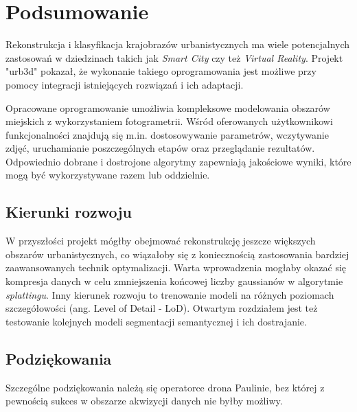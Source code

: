 \section{Podsumowanie}
Rekonstrukcja i klasyfikacja krajobrazów urbanistycznych ma wiele potencjalnych zastosowań w dziedzinach takich jak \textit{Smart City} czy też \textit{Virtual Reality}. Projekt "urb3d" pokazał, że wykonanie takiego oprogramowania jest możliwe przy pomocy integracji istniejących rozwiązań i ich adaptacji.

Opracowane oprogramowanie umożliwia kompleksowe modelowania obszarów miejskich z wykorzystaniem fotogrametrii. Wśród oferowanych użytkownikowi funkcjonalności znajdują się m.in. dostosowywanie parametrów, wczytywanie zdjęć, uruchamianie poszczególnych etapów oraz przeglądanie rezultatów. Odpowiednio dobrane i dostrojone algorytmy zapewniają jakościowe wyniki, które mogą być wykorzystywane razem lub oddzielnie.

\subsection{Kierunki rozwoju}
W przyszłości projekt mógłby obejmować rekonstrukcję jeszcze większych obszarów urbanistycznych, co wiązałoby się z koniecznością zastosowania bardziej zaawansowanych technik optymalizacji. Warta wprowadzenia mogłaby okazać się kompresja danych w celu zmniejszenia końcowej liczby gaussianów w algorytmie \textit{splattingu}. Inny kierunek rozwoju to trenowanie modeli na różnych poziomach szczegółowości (ang. Level of Detail - LoD). Otwartym rozdziałem jest też testowanie kolejnych modeli segmentacji semantycznej i ich dostrajanie.

\subsection{Podziękowania}
Szczególne podziękowania należą się operatorce drona Paulinie, bez której z pewnością sukces w obszarze akwizycji danych nie byłby możliwy.